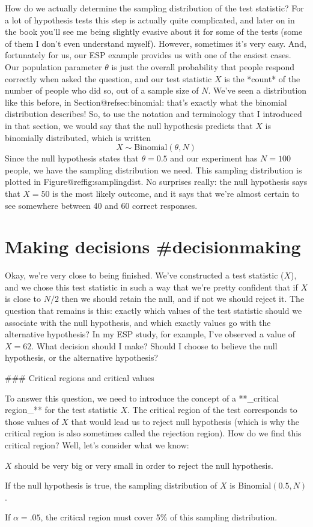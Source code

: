 How do we actually determine the sampling distribution of the test statistic? For a lot of hypothesis tests this step is actually quite complicated, and later on in the book you'll see me being slightly evasive about it for some of the tests (some of them I don't even understand myself). However, sometimes it's very easy. And, fortunately for us, our ESP example provides us with one of the easiest cases. Our population parameter $\theta$ is just the overall probability that people respond correctly when asked the question, and our test statistic $X$ is the *count* of the number of people who did so, out of a sample size of $N$. We've seen a distribution like this before, in Section@refsec:binomial: that's exactly what the binomial distribution describes! So, to use the notation and terminology that I introduced in that section, we would say that the null hypothesis predicts that $X$ is binomially distributed, which is written
$$
X \sim \mbox{Binomial}(\theta,N)
$$
Since the null hypothesis states that $\theta = 0.5$ and our experiment has $N=100$ people, we have the sampling distribution we need. This sampling distribution is plotted in Figure@reffig:samplingdist. No surprises really: the null hypothesis says that $X=50$ is the most likely outcome, and it says that we're almost certain to see somewhere between 40 and 60 correct responses. 

\section{Making decisions {#decisionmaking}}


Okay, we're very close to being finished. We've constructed a test statistic ($X$), and we chose this test statistic in such a way that we're pretty confident that if $X$ is close to $N/2$ then we should retain the null, and  if not we should reject it. The question that remains is this: exactly which values of the test statistic should we associate with the null hypothesis, and which exactly values go with the alternative hypothesis? In my ESP study, for example, I've observed a value of $X=62$. What decision should I make? Should I choose to believe the null hypothesis, or the alternative hypothesis?

### Critical regions and critical values

To answer this question, we need to introduce the concept of a **_critical region_** for the test statistic $X$. The critical region of the test corresponds to those values of $X$ that would lead us to reject null hypothesis (which is why the critical region is also sometimes called the rejection region). How do we find this critical region? Well, let's consider what we know: 
 \itemsep -2pt
\item $X$ should be very big or very small in order to reject the null hypothesis.
\item If the null hypothesis is true, the sampling distribution of $X$ is Binomial$(0.5, N)$.
\item If $\alpha =.05$, the critical region must cover 5\% of this sampling distribution. 

